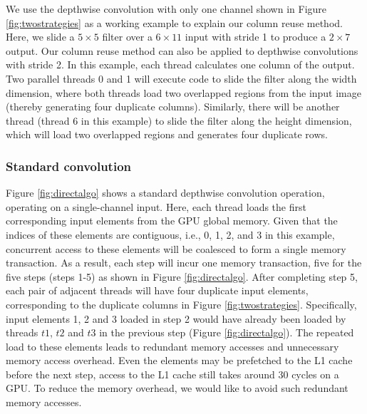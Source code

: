  We use the depthwise convolution with only one channel shown in Figure \ref{fig:twostrategies} as a working example to explain our column reuse method. 
Here, we slide a $5 \times 5$ filter over a $6 \times 11$ input with stride 1 to produce a $2 \times 7$ output.
Our column reuse method can also be applied to depthwise convolutions with stride 2. 
In this example, each thread calculates one column of the output. 
Two parallel threads 0 and 1 will execute code to slide the filter along the width dimension, where both threads load two overlapped regions from the input image (thereby generating four duplicate columns). 
Similarly, there will be another thread (thread 6 in this example) to slide the filter along the height dimension, which will load two overlapped regions and generates four duplicate rows.

\subsubsection{Standard convolution} Figure \ref{fig:directalgo} shows a standard depthwise convolution operation, operating on a single-channel input. 
Here, each thread loads the first corresponding input elements from the GPU global memory. 
Given that the indices of these elements are contiguous, i.e., 0, 1, 2, and 3 in this example, concurrent access to these elements will be coalesced to form a single memory transaction. 
As a result, each step will incur one memory transaction, five for the five steps (steps 1-5) as shown in Figure \ref{fig:directalgo}. 
After completing step 5, each pair of adjacent threads will have four duplicate input elements, corresponding to the duplicate columns in Figure \ref{fig:twostrategies}. 
Specifically, input elements 1, 2 and 3 loaded in step 2 would have already been loaded by threads $t1$, $t2$ and $t3$ in the previous step (Figure \ref{fig:directalgo}). 
The repeated load to these elements leads to redundant memory accesses and unnecessary memory access overhead. 
Even the elements may be prefetched to the L1 cache before the next step, access to the L1 cache still takes around 30 cycles on a GPU. 
To reduce the memory overhead, we would like to avoid such redundant memory accesses.


